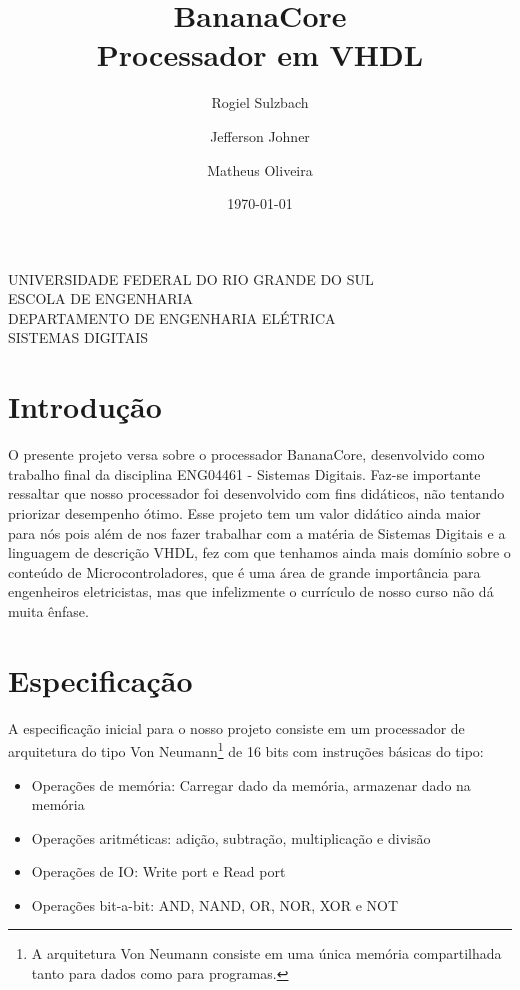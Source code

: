 \documentclass[11pt]{report}
\begin{document}
\title{\textbf{BananaCore}\\{\LARGE Processador em VHDL}}
\author{
  Rogiel Sulzbach
  \and
  Jefferson Johner
  \and
  Matheus Oliveira
}
\date{\today}

\begin{titlepage} \center
	{
		UNIVERSIDADE FEDERAL DO RIO GRANDE DO SUL\\
		ESCOLA DE ENGENHARIA\\
		DEPARTAMENTO DE ENGENHARIA ELÉTRICA\\
		SISTEMAS DIGITAIS
	}
	
	\vfill
	
	{\Huge
		\thetitle
	}
	
	\vfill
	
	{\Large
		\theauthor
	}
	
	\vfill
	
	{\small
		\thedate
	}
\end{titlepage}

\tableofcontents

\chapter{Introdução}

O presente projeto versa sobre o processador BananaCore, desenvolvido como trabalho final da disciplina ENG04461 - Sistemas Digitais. Faz-se importante ressaltar que nosso processador foi desenvolvido com fins didáticos, não tentando priorizar desempenho ótimo.
Esse projeto tem um valor didático ainda maior para nós pois além de nos fazer trabalhar com a matéria de Sistemas Digitais e a linguagem de descrição VHDL, fez com que tenhamos ainda mais domínio sobre o conteúdo de Microcontroladores, que é uma área de grande importância para engenheiros eletricistas, mas que infelizmente o currículo de nosso curso não dá muita ênfase.

\chapter{Especificação}

A especificação inicial para o nosso projeto consiste em um processador de arquitetura do tipo Von Neumann\footnote{A arquitetura Von Neumann consiste em uma única memória compartilhada tanto para dados como para programas.} de 16 bits com instruções básicas do tipo:

\begin{itemize}
	\item Operações de memória: Carregar dado da memória, armazenar dado na memória
	\item Operações aritméticas: adição, subtração, multiplicação e divisão
	\item Operações de IO: Write port e Read port
	\item Operações bit-a-bit: AND, NAND, OR, NOR, XOR e NOT
\end{itemize}
\end{document}
